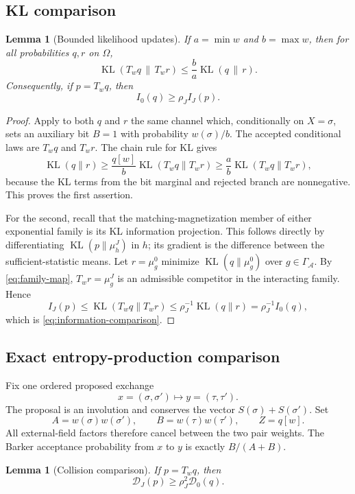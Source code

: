 \documentclass[11pt]{article}
\newtheorem{lemma}[theorem]{Lemma}
\newcommand{\KL}{\operatorname{KL}}
\newcommand{\cD}{\mathcal D}
\newcommand{\cA}{\mathcal A}
\begin{document}
\subsection{KL comparison}

\begin{lemma}[Bounded likelihood updates]\label{lem:kl}
If $a=\min w$ and $b=\max w$, then for all probabilities $q,r$ on
$\Omega$,
\[
 \KL(T_wq\,\|\,T_wr)\le\frac ba\KL(q\,\|\,r).
\]
Consequently, if $p=T_wq$, then
\begin{equation}\label{eq:information-comparison}
 I_0(q)\ge\rho_J I_J(p).
\end{equation}
\end{lemma}

\begin{proof}
Apply to both $q$ and $r$ the same channel which, conditionally on
$X=\sigma$, sets an auxiliary bit $B=1$ with probability $w(\sigma)/b$.
The accepted conditional laws are $T_wq$ and $T_wr$.  The chain rule for KL
gives
\[
 \KL(q\|r)\ge \frac{q[w]}{b}\KL(T_wq\|T_wr)
 \ge\frac ab\KL(T_wq\|T_wr),
\]
because the KL terms from the bit marginal and rejected branch are
nonnegative.  This proves the first assertion.

For the second, recall that the matching-magnetization member of either
exponential family is its KL information projection.  This follows directly
by differentiating $\KL(p\|\mu^J_h)$ in $h$; its gradient is the difference
between the sufficient-statistic means.  Let $r=\mu^0_g$ minimize
$\KL(q\|\mu^0_g)$ over $g\in\Gamma_{\cA}$.  By
\eqref{eq:family-map}, $T_wr=\mu^J_g$ is an admissible competitor in the
interacting family.  Hence
\[
 I_J(p)\le\KL(T_wq\|T_wr)
 \le\rho_J^{-1}\KL(q\|r)=\rho_J^{-1}I_0(q),
\]
which is \eqref{eq:information-comparison}.
\end{proof}

\subsection{Exact entropy-production comparison}

Fix one ordered proposed exchange
\[
 x=(\sigma,\sigma')\longmapsto y=(\tau,\tau').
\]
The proposal is an involution and conserves the vector
$S(\sigma)+S(\sigma')$.  Set
\[
 A=w(\sigma)w(\sigma'),\qquad B=w(\tau)w(\tau'),
 \qquad Z=q[w].
\]
All external-field factors therefore cancel between the two pair weights.
The Barker acceptance probability from $x$ to $y$ is exactly
$B/(A+B)$.

\begin{lemma}[Collision comparison]\label{lem:diss}
If $p=T_wq$, then
\begin{equation}\label{eq:diss-comparison}
 \cD_J(p)\ge\rho_J^2\cD_0(q).
\end{equation}
\end{lemma}
\end{document}
